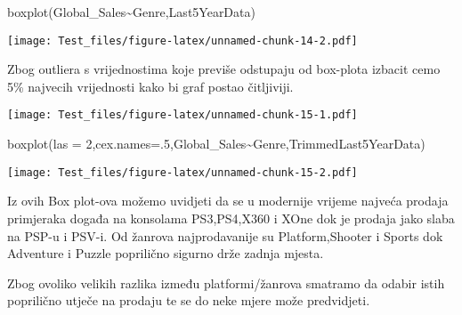 \documentclass[
]{article}
\newenvironment{Shaded}{\begin{snugshade}}{\end{snugshade}}
\newcommand{\AttributeTok}[1]{\textcolor[rgb]{0.77,0.63,0.00}{#1}}
\newcommand{\DecValTok}[1]{\textcolor[rgb]{0.00,0.00,0.81}{#1}}
\newcommand{\FloatTok}[1]{\textcolor[rgb]{0.00,0.00,0.81}{#1}}
\newcommand{\FunctionTok}[1]{\textcolor[rgb]{0.00,0.00,0.00}{#1}}
\newcommand{\NormalTok}[1]{#1}
\newcommand{\OtherTok}[1]{\textcolor[rgb]{0.56,0.35,0.01}{#1}}
\newcommand{\SpecialCharTok}[1]{\textcolor[rgb]{0.00,0.00,0.00}{#1}}
\begin{document}
\begin{Shaded}
\begin{Highlighting}[]
\FunctionTok{boxplot}\NormalTok{(Global\_Sales}\SpecialCharTok{\textasciitilde{}}\NormalTok{Genre,Last5YearData)}
\end{Highlighting}
\end{Shaded}

\texttt{[image: Test\_files/figure-latex/unnamed-chunk-14-2.pdf]}

Zbog outliera s vrijednostima koje previše odstupaju od box-plota
izbacit cemo 5\% najvecih vrijednosti kako bi graf postao čitljiviji.

\begin{Shaded}
\end{Shaded}

\texttt{[image: Test\_files/figure-latex/unnamed-chunk-15-1.pdf]}

\begin{Shaded}
\begin{Highlighting}[]
\FunctionTok{boxplot}\NormalTok{(}\AttributeTok{las =} \DecValTok{2}\NormalTok{,}\AttributeTok{cex.names=}\NormalTok{.}\DecValTok{5}\NormalTok{,Global\_Sales}\SpecialCharTok{\textasciitilde{}}\NormalTok{Genre,TrimmedLast5YearData)}
\end{Highlighting}
\end{Shaded}

\texttt{[image: Test\_files/figure-latex/unnamed-chunk-15-2.pdf]}

Iz ovih Box plot-ova možemo uvidjeti da se u modernije vrijeme najveća
prodaja primjeraka događa na konsolama PS3,PS4,X360 i XOne dok je
prodaja jako slaba na PSP-u i PSV-i. Od žanrova najprodavanije su
Platform,Shooter i Sports dok Adventure i Puzzle poprilično sigurno drže
zadnja mjesta.

Zbog ovoliko velikih razlika između platformi/žanrova smatramo da odabir
istih poprilično utječe na prodaju te se do neke mjere može predvidjeti.
\end{document}
